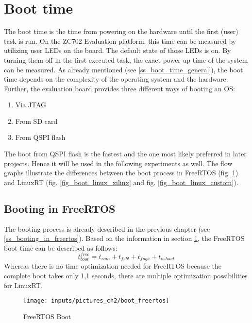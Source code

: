 \section{Boot time}\label{s_boot_time}
The boot time is the time from powering on the hardware until the first (user) task is run. 
On the ZC702 Evaluation platform, this time can be measured by utilizing user \acp{LED} on the board.  
The default state of those \acp{LED} is on.
By turning them off in the first executed task, the exact power up time of the system can be measured.  
As already mentioned (see \ref{ss_boot_time_general}), the boot time depends on the complexity of the operating system and the hardware. 
Further, the evaluation board provides three different ways of booting an \ac{OS}:
\begin{enumerate}
	\item Via \ac{JTAG}
	\item From \ac{SD} card
	\item From \ac{QSPI} flash
\end{enumerate}
The boot from \ac{QSPI} flash is the fastest and the one most likely preferred in later projects.
Hence it will be used in the following experiments as well.
The flow graphs illustrate the differences between the boot process in FreeRTOS (fig. \ref{fig_boot_freertos}) and LinuxRT (fig. \ref{fig_boot_linux_xilinx} and fig. \ref{fig_boot_linux_custom}).

\subsection{Booting in FreeRTOS}
The booting process is already described in the previous chapter (see \ref{ss_booting_in_freertos}).
Based on the information in section \ref{s_boot_time}, the FreeRTOS boot time can be described as follows:
	\begin{equation}
		t_{boot}^{free} = t_{rom} + t_{fsbl} +  t_{fpga} + t_{osload} \label{eq_t_boot_free} 
	\end{equation}
Whereas there is no time optimization needed for FreeRTOS because the complete boot takes only 1,1 seconds, there are multiple optimization possibilities for LinuxRT. 

\begin{figure}[htb]
		\begin{center}
			\texttt{[image: inputs/pictures\_ch2/boot\_freertos]}
			\caption[FreeRTOS boot]{FreeRTOS Boot \cite{xilinx:zbff}} \label{fig_boot_freertos}
		\end{center}
\end{figure} 

